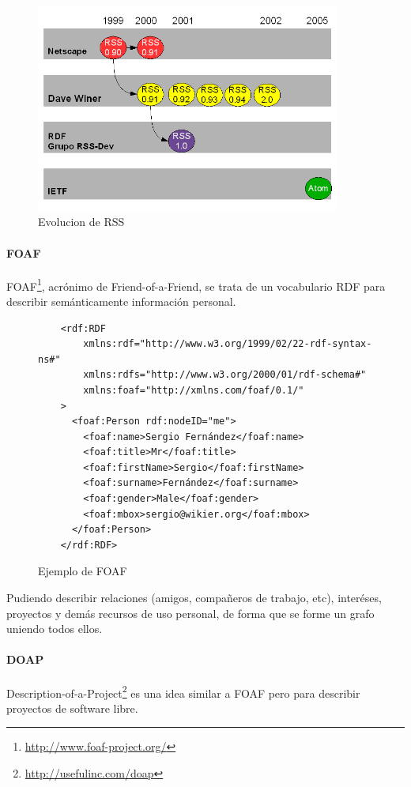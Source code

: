 \begin{figure}[ht]
	\centering
	\includegraphics[width=10cm]{images/rssEvolution.png}
	\caption{Evolucion de RSS}
	\label{fig:rssEvolution}
\end{figure}

\paragraph{FOAF}

FOAF\footnote{\url{http://www.foaf-project.org/}}, acrónimo de Friend-of-a-Friend, 
se trata de un vocabulario RDF para describir semánticamente información personal.

\begin{figure} [ht]
\begin{verbatim}
	<rdf:RDF
		xmlns:rdf="http://www.w3.org/1999/02/22-rdf-syntax-ns#"
		xmlns:rdfs="http://www.w3.org/2000/01/rdf-schema#"
		xmlns:foaf="http://xmlns.com/foaf/0.1/"
	>
	  <foaf:Person rdf:nodeID="me">
	    <foaf:name>Sergio Fernández</foaf:name>
	    <foaf:title>Mr</foaf:title>
	    <foaf:firstName>Sergio</foaf:firstName>
	    <foaf:surname>Fernández</foaf:surname>
	    <foaf:gender>Male</foaf:gender>
	    <foaf:mbox>sergio@wikier.org</foaf:mbox>
	  </foaf:Person>
	</rdf:RDF>
\end{verbatim}
	\caption{Ejemplo de FOAF}
	\label{fig:ejemplo.foaf}
\end{figure}

Pudiendo describir relaciones (amigos, compañeros de trabajo, etc), interéses,
proyectos y demás recursos de uso personal, de forma que se forme un grafo 
uniendo todos ellos.

\paragraph{DOAP}

Description-of-a-Project\footnote{\url{http://usefulinc.com/doap}} es una idea 
similar a FOAF pero para describir proyectos de software libre.

